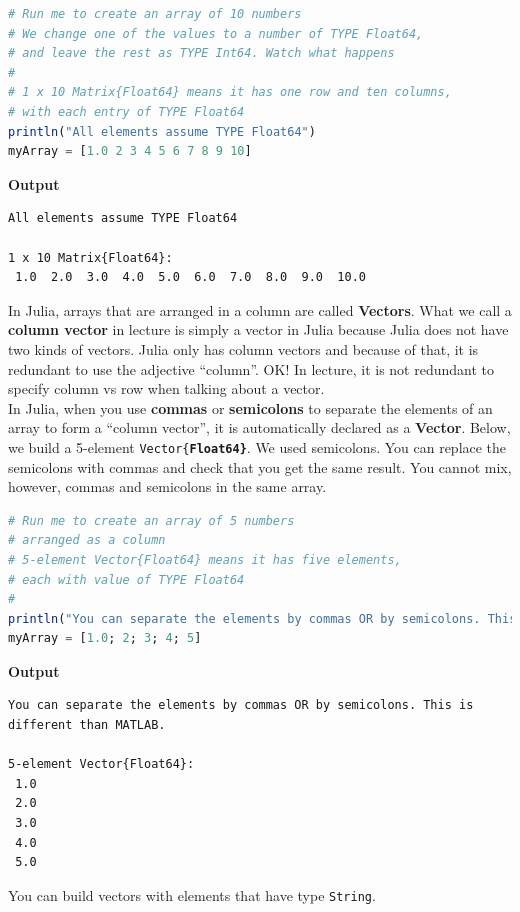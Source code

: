 \begin{lstlisting}[language=Julia,style=mystyle]
# Run me to create an array of 10 numbers
# We change one of the values to a number of TYPE Float64, 
# and leave the rest as TYPE Int64. Watch what happens
# 
# 1 x 10 Matrix{Float64} means it has one row and ten columns, 
# with each entry of TYPE Float64
println("All elements assume TYPE Float64")
myArray = [1.0 2 3 4 5 6 7 8 9 10]
\end{lstlisting}
\textbf{Output} 
\begin{verbatim}
All elements assume TYPE Float64

1 x 10 Matrix{Float64}:
 1.0  2.0  3.0  4.0  5.0  6.0  7.0  8.0  9.0  10.0
\end{verbatim}

In Julia, arrays that are arranged in a column are called \textbf{Vectors}. What we call a \textbf{column vector} in lecture is simply a vector in Julia because Julia does not have two kinds of vectors. Julia only has column vectors and because of that, it is redundant to use the adjective ``column''. OK! In lecture, it is not redundant to specify column vs row when talking about a vector.\\

In Julia, when you use \textbf{commas} or \textbf{semicolons} to separate the elements of an array to form a ``column vector'', it is automatically declared as a \textbf{Vector}. Below, we build a 
5-element \texttt{Vector\{\bf Float64\}}. We used semicolons. You can replace the semicolons with commas and check that you get the same result. You cannot mix, however, commas and semicolons in the same array. 

\begin{lstlisting}[language=Julia,style=mystyle]
# Run me to create an array of 5 numbers
# arranged as a column
# 5-element Vector{Float64} means it has five elements, 
# each with value of TYPE Float64
#
println("You can separate the elements by commas OR by semicolons. This is different than MATLAB.")
myArray = [1.0; 2; 3; 4; 5]
\end{lstlisting}
\textbf{Output} 
\begin{verbatim}
You can separate the elements by commas OR by semicolons. This is different than MATLAB.

5-element Vector{Float64}:
 1.0
 2.0
 3.0
 4.0
 5.0
\end{verbatim}

You can build vectors with elements that have type \texttt{String}.


